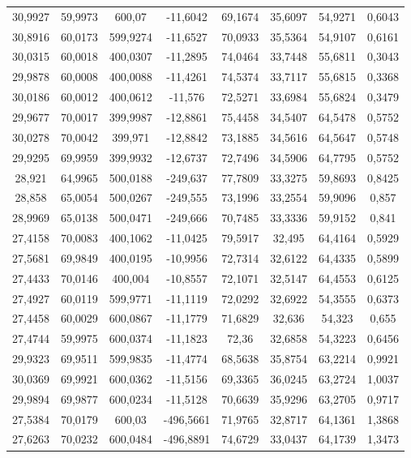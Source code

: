 \begin{longtable}{@{}cccccccc@{}}
30,9927 & 59,9973 & 600,07 & -11,6042 & 69,1674 & 35,6097 & 54,9271 & 0,6043 \\
30,8916 & 60,0173 & 599,9274 & -11,6527 & 70,0933 & 35,5364 & 54,9107 & 0,6161 \\
30,0315 & 60,0018 & 400,0307 & -11,2895 & 74,0464 & 33,7448 & 55,6811 & 0,3043 \\
29,9878 & 60,0008 & 400,0088 & -11,4261 & 74,5374 & 33,7117 & 55,6815 & 0,3368 \\
30,0186 & 60,0012 & 400,0612 & -11,576 & 72,5271 & 33,6984 & 55,6824 & 0,3479 \\
29,9677 & 70,0017 & 399,9987 & -12,8861 & 75,4458 & 34,5407 & 64,5478 & 0,5752 \\
30,0278 & 70,0042 & 399,971 & -12,8842 & 73,1885 & 34,5616 & 64,5647 & 0,5748 \\
29,9295 & 69,9959 & 399,9932 & -12,6737 & 72,7496 & 34,5906 & 64,7795 & 0,5752 \\
28,921 & 64,9965 & 500,0188 & -249,637 & 77,7809 & 33,3275 & 59,8693 & 0,8425 \\
28,858 & 65,0054 & 500,0267 & -249,555 & 73,1996 & 33,2554 & 59,9096 & 0,857 \\
28,9969 & 65,0138 & 500,0471 & -249,666 & 70,7485 & 33,3336 & 59,9152 & 0,841 \\
27,4158 & 70,0083 & 400,1062 & -11,0425 & 79,5917 & 32,495 & 64,4164 & 0,5929 \\
27,5681 & 69,9849 & 400,0195 & -10,9956 & 72,7314 & 32,6122 & 64,4335 & 0,5899 \\
27,4433 & 70,0146 & 400,004 & -10,8557 & 72,1071 & 32,5147 & 64,4553 & 0,6125 \\
27,4927 & 60,0119 & 599,9771 & -11,1119 & 72,0292 & 32,6922 & 54,3555 & 0,6373 \\
27,4458 & 60,0029 & 600,0867 & -11,1779 & 71,6829 & 32,636 & 54,323 & 0,655 \\
27,4744 & 59,9975 & 600,0374 & -11,1823 & 72,36 & 32,6858 & 54,3223 & 0,6456 \\
29,9323 & 69,9511 & 599,9835 & -11,4774 & 68,5638 & 35,8754 & 63,2214 & 0,9921 \\
30,0369 & 69,9921 & 600,0362 & -11,5156 & 69,3365 & 36,0245 & 63,2724 & 1,0037 \\
29,9894 & 69,9877 & 600,0234 & -11,5128 & 70,6639 & 35,9296 & 63,2705 & 0,9717 \\
27,5384 & 70,0179 & 600,03 & -496,5661 & 71,9765 & 32,8717 & 64,1361 & 1,3868 \\
27,6263 & 70,0232 & 600,0484 & -496,8891 & 74,6729 & 33,0437 & 64,1739 & 1,3473 \\

\end{longtable}
